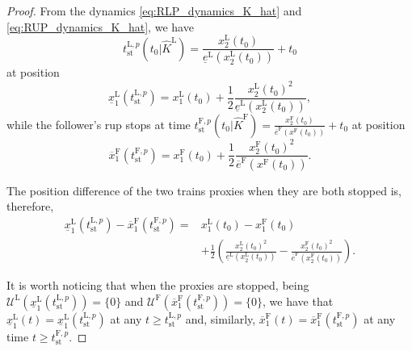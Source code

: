 \begin{theorem}
\begin{proof}
		
		From the dynamics  \eqref{eq:RLP_dynamics_K_hat} and \eqref{eq:RUP_dynamics_K_hat}, we have 
		\begin{equation}\label{eq:t_stop_L_P}
			t_{\mathrm{st}}^{\mathrm{L},p}(t_0 |\hat{K}^\mathrm{L}) = \frac{x_2^\mathrm{L}(t_0)}{\underline{e}^\mathrm{L}\left(x_2^\mathrm{L}(t_0)\right)} + t_0
		\end{equation}
		at position
		\begin{equation}\label{eq:leader_RLP_stop_position}
			\underline{x}_1^\mathrm{L}(t_{\mathrm{st}}^{\mathrm{L},p} )=x_1^\mathrm{L}(t_0)+\frac{1}{2} \frac{{x_2^\mathrm{L}(t_0)}^2}{\underline{e}^\mathrm{L}\left(x_2^\mathrm{L}(t_0)\right)},
		\end{equation}
		while the follower's \gls{rup} stops at time $t_{\mathrm{st}}^{\mathrm{F},p}(t_0 |\hat{K}^\mathrm{F})= \frac{x_2^\mathrm{F}(t_0)}{\overline{e}^\mathrm{F}\left(x^\mathrm{F}(t_0)\right)} + t_0$ at position
		\begin{equation}\label{eq:follower_RUP_stop_position}
			\overline{x}_1^\mathrm{F}(t_{\mathrm{st}}^{\mathrm{F},p} )=x_1^\mathrm{F}(t_0)+\frac{1}{2} \frac{{x_2^\mathrm{F}(t_0)}^2}{\overline{e}^\mathrm{F}\left(x^\mathrm{F}(t_0)\right)}.
		\end{equation}
		
		
		The position difference of the two trains proxies when they are both stopped is, therefore, 
		\begin{equation}\label{eq:proxy_difference}
			\begin{aligned}
				\underline{x}_1^\mathrm{L}(t_{\mathrm{st}}^{\mathrm{L},p} ) - \overline{x}_1^{\mathrm{F}}(t_{\mathrm{st}}^{\mathrm{F},p}  )=&
				x_1^\mathrm{L}(t_0)-x_1^\mathrm{F}(t_0)\\
				&+\frac{1}{2}
				\left(\frac{{x_2^\mathrm{L}(t_0)}^2}{\underline{e}^\mathrm{L}\left(x_2^\mathrm{L}(t_0)\right)}
				-
				\frac{{x_2^\mathrm{F}(t_0)}^2}{\overline{e}^\mathrm{F}\left(x_2^\mathrm{F}(t_0)\right)}
				\right).
			\end{aligned}
		\end{equation}
		
		It is worth noticing that when the proxies are stopped, being $\mathcal{U}^\mathrm{L}(\underline{x}_1^\mathrm{L}(t_{\mathrm{st}}^{\mathrm{L},p} ))=\{0\}$ and $\mathcal{U}^\mathrm{F}(\overline{x}_1^\mathrm{F}(t_{\mathrm{st}}^{\mathrm{F},p}  ))=\{0\}$, we have that $\underline{x}_1^\mathrm{L}(t)=\underline{x}_1^\mathrm{L}(t_{\mathrm{st}}^{\mathrm{L},p} )$ at any $t\geq t_{\mathrm{st}}^{\mathrm{L},p}$ and, similarly, 
		$\overline{x}_1^\mathrm{F}(t)=\overline{x}_1^\mathrm{F}(t_{\mathrm{st}}^{\mathrm{F},p})$ at any time $t\geq t_{\mathrm{st}}^{\mathrm{F},p}$. 
		

\end{proof}
\end{theorem}
